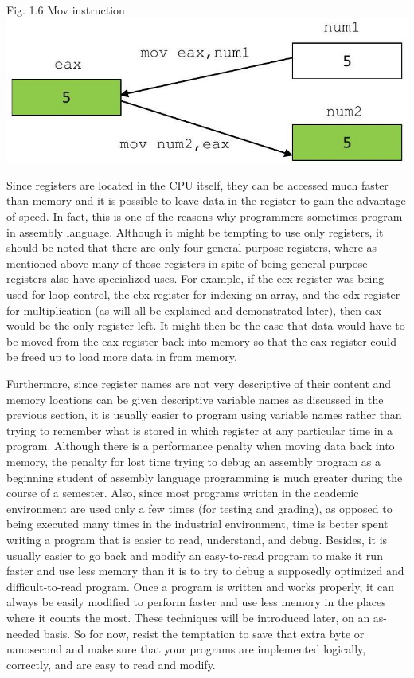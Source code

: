 \documentclass[10pt]{article}
\begin{document}
Fig. 1.6 Mov instruction\\
\includegraphics[max width=\textwidth, center]{2025_03_24_ebe50cc223a6fbc49eecg-026}

Since registers are located in the CPU itself, they can be accessed much faster than memory and it is possible to leave data in the register to gain the advantage of speed. In fact, this is one of the reasons why programmers sometimes program in assembly language. Although it might be tempting to use only registers, it should be noted that there are only four general purpose registers, where as mentioned above many of those registers in spite of being general purpose registers also have specialized uses. For example, if the ecx register was being used for loop control, the ebx register for indexing an array, and the edx register for multiplication (as will all be explained and demonstrated later), then eax would be the only register left. It might then be the case that data would have to be moved from the eax register back into memory so that the eax register could be freed up to load more data in from memory.

Furthermore, since register names are not very descriptive of their content and memory locations can be given descriptive variable names as discussed in the previous section, it is usually easier to program using variable names rather than trying to remember what is stored in which register at any particular time in a program. Although there is a performance penalty when moving data back into memory, the penalty for lost time trying to debug an assembly program as a beginning student of assembly language programming is much greater during the course of a semester. Also, since most programs written in the academic environment are used only a few times (for testing and grading), as opposed to being executed many times in the industrial environment, time is better spent writing a program that is easier to read, understand, and debug. Besides, it is usually easier to go back and modify an easy-to-read program to make it run faster and use less memory than it is to try to debug a supposedly optimized and difficult-to-read program. Once a program is written and works properly, it can always be easily modified to perform faster and use less memory in the places where it counts the most. These techniques will be introduced later, on an as-needed basis. So for now, resist the temptation to save that extra byte or nanosecond and make sure that your programs are implemented logically, correctly, and are easy to read and modify.
\end{document}

